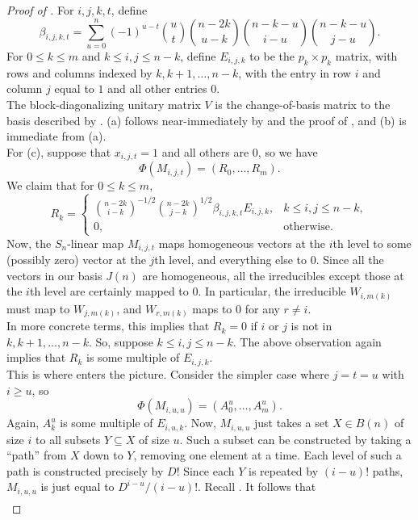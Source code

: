 	\begin{proof}[Proof of ]
		For $i,j,k,t$, define
		\[ \beta_{i,j,k,t} = \sum_{u=0}^{n} (-1)^{u-t} \binom{u}{t} \binom{n-2k}{u-k} \binom{n-k-u}{i-u} \binom{n-k-u}{j-u}. \]
		For $0 \le k \le m$ and $k \le i,j \le n-k$, define $E_{i,j,k}$ to be the $p_k \times p_k$ matrix, with rows and columns indexed by $k,k+1,\ldots,n-k$, with the entry in row $i$ and column $j$ equal to $1$ and all other entries $0$.\\
		The block-diagonalizing unitary matrix $V$ is the change-of-basis matrix to the basis described by . (a) follows near-immediately by  and the proof of , and (b) is immediate from (a).\\
		For (c), suppose that $x_{i,j,t} = 1$ and all others are $0$, so we have
		\[ \Phi(M_{i,j,t}) = (R_0,\ldots,R_m). \]
		We claim that for $0 \le k \le m$,
		\[ R_k = \begin{cases} \binom{n-2k}{i-k}^{-1/2} \binom{n-2k}{j-k}^{1/2} \beta_{i,j,k,t} E_{i,j,k}, & k \le i,j \le n-k, \\ 0, & \text{otherwise.} \end{cases} \]
		Now, the $S_n$-linear map $M_{i,j,t}$ maps homogeneous vectors at the $i$th level to some (possibly zero) vector at the $j$th level, and everything else to $0$. Since all the vectors in our basis $J(n)$ are homogeneous, all the irreducibles except those at the $i$th level are certainly mapped to $0$. In particular, the irreducible $W_{i,m(k)}$ must map to $W_{j,m(k)}$, and $W_{r,m(k)}$ maps to $0$ for any $r \ne i$.\\
		In more concrete terms, this implies that $R_k = 0$ if $i$ or $j$ is not in $k,k+1,\ldots,n-k$. So, suppose $k \le i,j \le n-k$. The above observation again implies that $R_k$ is some multiple of $E_{i,j,k}$.\\
		This is where  enters the picture. Consider the simpler case where $j=t=u$ with $i \ge u$, so
		\[ \Phi(M_{i,u,u}) = (A_0^u,\ldots,A_m^u). \]
		Again, $A_k^u$ is some multiple of $E_{i,u,k}$. Now, $M_{i,u,u}$ just takes a set $X \in B(n)$ of size $i$ to all subsets $Y \subseteq X$ of size $u$. Such a subset can be constructed by taking a ``path'' from $X$ down to $Y$, removing one element at a time. Each level of such a path is constructed precisely by $D$! Since each $Y$ is repeated by $(i-u)!$ paths, $M_{i,u,u}$ is just equal to $D^{i-u}/(i-u)!$. Recall . It follows that
		\begin{align*}

\end{align*}
\end{proof}
